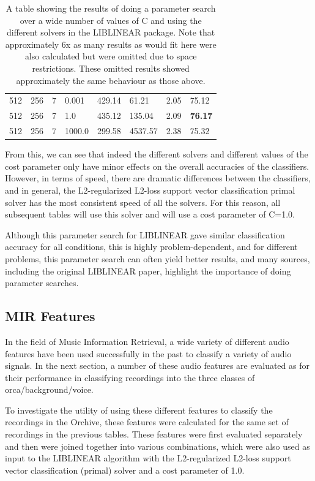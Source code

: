 \begin{table}
\begin{tabular}{|l|l|l|l|l|l|l|l|}
\hline
 512 & 256     &   7 & 0.001   &  429.14  &     61.21  &  2.05  &  75.12  \\
 512 & 256     &   7 & 1.0     &  435.12  &    135.04  &  2.09  &  \textbf{76.17}  \\
 512 & 256     &   7 & 1000.0  &  299.58  &   4537.57  &  2.38  &  75.32  \\
\hline
\end{tabular}
\caption{A table showing the results of doing a
  parameter search over a wide number of values of C and using the
  different solvers in the LIBLINEAR package.  Note that
  approximately 6x as many results as would fit here were also
  calculated but were omitted due to space restrictions.  These
  omitted results showed approximately the same behaviour as those
  above.}
\label{table:obv-liblinearParams}
\end{table}

From this, we can see that indeed the different solvers and different
values of the cost parameter only have minor effects on the overall
accuracies of the classifiers.  However, in terms of speed, there are
dramatic differences between the classifiers, and in general, the
L2-regularized L2-loss support vector classification primal solver has
the most consistent speed of all the solvers.  For this reason, all
subsequent tables will use this solver and will use a cost parameter
of C=1.0.

Although this parameter search for LIBLINEAR
\cite{rongen2008liblinear} gave similar classification accuracy for
all conditions, this is highly problem-dependent, and for different
problems, this parameter search can often yield better results, and
many sources, including the original LIBLINEAR paper, highlight the
importance of doing parameter searches.

%
%
\subsection{MIR Features}

In the field of Music Information Retrieval, a wide variety of
different audio features have been used successfully in the past to
classify a variety of audio signals.  In the next section, a number of
these audio features are evaluated as for their performance in
classifying recordings into the three classes of
orca/background/voice.  

To investigate the utility of using these different features to
classify the recordings in the Orchive, these features were calculated
for the same set of recordings in the previous tables.  These features
were first evaluated separately and then were joined together into
various combinations, which were also used as input to the LIBLINEAR
algorithm with the L2-regularized L2-loss support vector
classification (primal) solver and a cost parameter of 1.0.

